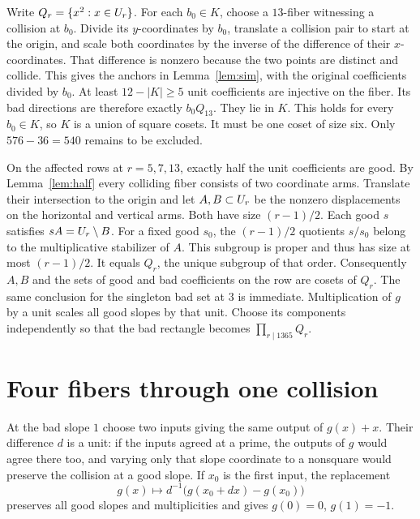 Write $Q_r=\{x^2:x\in U_r\}$. For each $b_0\in K$, choose a $13$-fiber witnessing a collision at $b_0$. Divide its $y$-coordinates by $b_0$, translate a collision pair to start at the origin, and scale both coordinates by the inverse of the difference of their $x$-coordinates. That difference is nonzero because the two points are distinct and collide. This gives the anchors in Lemma~\ref{lem:sim}, with the original coefficients divided by $b_0$. At least $12-|K|\ge5$ unit coefficients are injective on the fiber. Its bad directions are therefore exactly $b_0Q_{13}$. They lie in $K$. This holds for every $b_0\in K$, so $K$ is a union of square cosets. It must be one coset of size six. Only $576-36=540$ remains to be excluded.

On the affected rows at $r=5,7,13$, exactly half the unit coefficients are good. By Lemma~\ref{lem:half} every colliding fiber consists of two coordinate arms. Translate their intersection to the origin and let $A,B\subset U_r$ be the nonzero displacements on the horizontal and vertical arms. Both have size $(r-1)/2$. Each good $s$ satisfies $sA=U_r\setminus B$. For a fixed good $s_0$, the $(r-1)/2$ quotients $s/s_0$ belong to the multiplicative stabilizer of $A$. This subgroup is proper and thus has size at most $(r-1)/2$. It equals $Q_r$, the unique subgroup of that order. Consequently $A,B$ and the sets of good and bad coefficients on the row are cosets of $Q_r$. The same conclusion for the singleton bad set at $3$ is immediate. Multiplication of $g$ by a unit scales all good slopes by that unit. Choose its components independently so that the bad rectangle becomes $\prod_{r\mid1365}Q_r$.

\section{Four fibers through one collision}
At the bad slope $1$ choose two inputs giving the same output of $g(x)+x$. Their difference $d$ is a unit: if the inputs agreed at a prime, the outputs of $g$ would agree there too, and varying only that slope coordinate to a nonsquare would preserve the collision at a good slope. If $x_0$ is the first input, the replacement
\[
 g(x)\longmapsto d^{-1}\bigl(g(x_0+dx)-g(x_0)\bigr)
\]
preserves all good slopes and multiplicities and gives $g(0)=0$, $g(1)=-1$.

